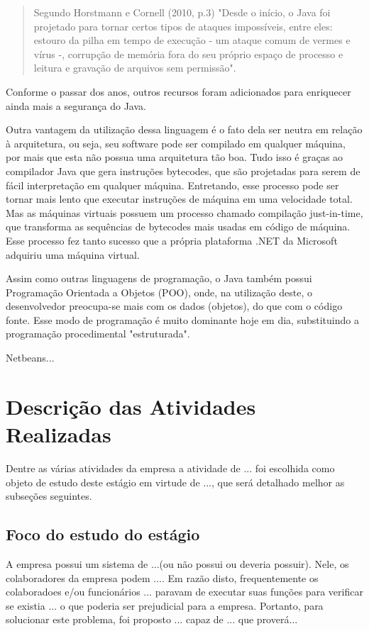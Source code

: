 \documentclass[12pt]{article}
\begin{document}
\begin{quote}
Segundo Horstmann e Cornell (2010, p.3) "Desde o início, o Java foi projetado para tornar certos tipos de ataques impossíveis, entre eles: estouro da pilha em tempo de execução - um ataque comum de vermes e vírus -, corrupção de memória fora do seu próprio espaço de processo e leitura e gravação de arquivos sem permissão".
\end{quote}

Conforme o passar dos anos, outros recursos foram adicionados para enriquecer ainda mais a segurança do Java.

	Outra vantagem da utilização dessa linguagem é o fato dela ser neutra em relação à arquitetura, ou seja, seu software pode ser compilado em qualquer máquina, por mais que esta não possua uma arquitetura tão boa. Tudo isso é graças ao compilador Java que gera instruções bytecodes, que são projetadas para serem de fácil interpretação em qualquer máquina. Entretando, esse processo pode ser tornar mais lento que executar instruções de máquina em uma velocidade total. Mas as máquinas virtuais possuem um processo chamado compilação just-in-time, que transforma as sequências de bytecodes mais usadas em código de máquina. Esse processo fez tanto sucesso que a própria plataforma .NET da Microsoft adquiriu uma máquina virtual.
    
	Assim como outras linguagens de programação, o Java também possui Programação Orientada a Objetos (POO), onde, na utilização deste, o desenvolvedor preocupa-se mais com os dados (objetos), do que com o código fonte. Esse modo de programação é muito dominante hoje em dia, substituindo a programação procedimental "estruturada".
    
    Netbeans...

\section{Descrição das Atividades Realizadas}
Dentre as várias atividades da empresa a atividade de ... foi escolhida como objeto de estudo deste estágio em virtude de ..., que será detalhado melhor as subseções seguintes.

\subsection{Foco do estudo do estágio}

A empresa possui um sistema de ...(ou não possui ou deveria possuir). Nele, os colaboradores da empresa podem .... Em razão disto, frequentemente os colaboradoes e/ou funcionários ... paravam de executar suas funções para verificar se existia ... o que poderia ser prejudicial para a empresa. Portanto, para solucionar este problema, foi proposto ... capaz de ... que proverá... 
\end{document}
